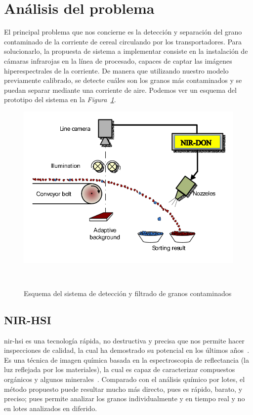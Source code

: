 \section{Análisis del problema}

El principal problema que nos concierne es la detección y separación del grano contaminado de la corriente de cereal circulando por los transportadores. Para solucionarlo,
la propuesta de sistema a implementar consiste en la instalación de cámaras infrarojas en la línea de procesado, capaces de captar las imágenes hiperespectrales de la
corriente. De manera que utilizando nuestro modelo previamente calibrado, se detecte cuáles son los granos más contaminados y se puedan separar mediante una corriente de aire. 
Podemos ver un esquema del prototipo del sistema en la \textit{Figura\ \ref{fig:detection-system}}.

\begin{figure}[!h]
    \centering
    \includegraphics[width=0.7\linewidth]{media/images/esquema-del-sistema.png}
    \caption{Esquema del sistema de detección y filtrado de granos contaminados}\ \label{fig:detection-system}
\end{figure}


\subsection{NIR-HSI}


\gls{nir-hsi} es una tecnología rápida, no destructiva y precisa que nos permite hacer inspecciones de calidad, la cual ha demostrado su potencial en los últimos años\ \cite{Applicat5:online}. 
Es una técnica de imagen química basada en la espectroscopia de reflectancia (la luz reflejada por los materiales), la cual es capaz de caracterizar compuestos orgánicos y algunos minerales\ \cite{NIRHyper23:online}. Comparado con el análisis químico por lotes, el método propuesto puede resultar mucho más directo, pues es rápido, barato, y preciso; pues permite analizar los granos individualmente y en tiempo real y no en lotes analizados en diferido.

